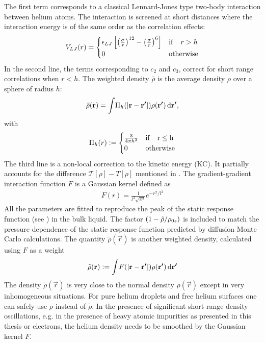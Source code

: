 		The first term corresponds to a classical Lennard-Jones type two-body interaction between helium atoms. The interaction is screened at short distances where the interaction energy is of the same order as the correlation effects:
		\begin{align}
			V_{LJ}(r) = \begin{cases}
			\epsilon_{LJ} \left[\left(\frac{\sigma}{r} \right)^{12} - \left(\frac{\sigma}{r} \right)^{6} \right] & {\rm if} \quad r > h \\
			0 & {\rm otherwise}
			\end{cases}\label{eq9}
		\end{align}
		In the second line, the terms corresponding to $c_2$ and $c_3$, correct for short range correlations when $r<h$. The weighted density $\bar{\rho}$ is the average density $\rho$ over a sphere of radius $h$:
		\begin{align}
			\bar{\rho}(\bm{\mathrm{r}}) = \int\!\Pi_h\qty(\abs{\bm{\mathrm{r}}-\bm{\mathrm{r'}}})\rho({\bm{\mathrm{r'}}})\,\mathrm{d}{\bm{\mathrm{r'}}},
		\end{align}
		with
		\begin{align}
			\Pi_h(r) \vcentcolon= \begin{cases}
				\frac{3}{4\pi h^3} & \rm{if} \quad r\leq h \\
				0 & \rm{otherwise}
			\end{cases}
		\end{align}
		The third line is a non-local correction to the kinetic energy (KC). It partially accounts for the difference $\mathcal{T}[\rho]-T[\rho]$ mentioned in . The gradient-gradient interaction function $F$ is a Gaussian kernel defined as
		\begin{align}
			F(r) = \frac{1}{l^3\sqrt{\pi^3}}\unit{e}^{-r^2/l^2}
		\end{align}
		All the parameters are fitted to reproduce the peak of the static response function (see ) in the bulk liquid. The factor $\qty(1-\tilde{\rho}/\rho_{0s})$ is included to match the pressure dependence of the static response function predicted by diffusion Monte Carlo calculations\citep{Moroni1992}. The quantity $\tilde{\rho}(\vec{r})$ is another weighted density, calculated using $F$ as a weight
		\begin{align}
			\tilde{\rho}(\bm{\mathrm{r}}) \vcentcolon= \int\!F\qty(\abs{\bm{\mathrm{r}}-\bm{\mathrm{r'}}})\rho(\bm{\mathrm{r'}})\,\mathrm{d}{\bm{\mathrm{r'}}}
		\end{align}
		The density $\tilde{\rho}(\vec{r})$ is very close to the normal density $\rho(\vec{r})$ except in very inhomogeneous situations. For pure helium droplets and free helium surfaces one can safely use $\rho$ instead of $\tilde{\rho}$. In the presence of significant short-range density oscillations, e.g. in the presence of heavy atomic impurities as presented in this thesis or electrons, the helium density needs to be smoothed by the Gaussian kernel $F$.  
			

